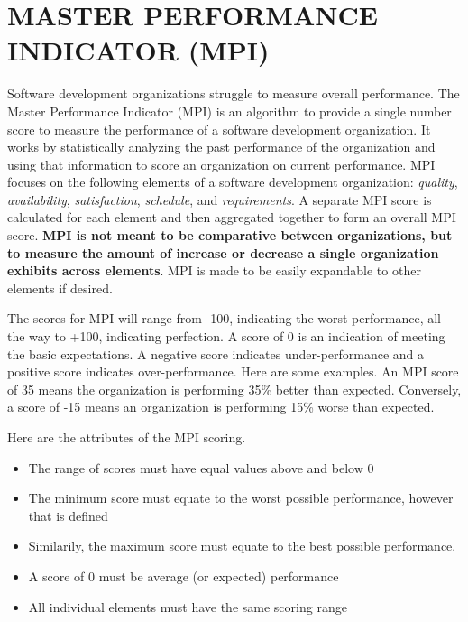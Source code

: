 \documentclass[SDSUThesis.tex]{subfiles}
\begin{document}
\section{MASTER PERFORMANCE INDICATOR (MPI)}

    Software development organizations struggle to measure overall performance.  
    The Master Performance Indicator (MPI) is an algorithm to provide a single 
    number score to measure the performance of a software development organization. 
    It works by statistically analyzing the past performance of the 
    organization and using that information to score an organization 
    on current performance.  MPI focuses on the following 
    elements of a software development organization: \textit{quality}, 
    \textit{availability}, \textit{satisfaction}, \textit{schedule},
    and \textit{requirements}. A separate MPI
    score is calculated for each element and 
    then aggregated together to form an overall 
    MPI score.   \textbf{MPI is not meant to be comparative between
    organizations, but to measure the amount of increase or decrease
    a single organization exhibits across elements}.  MPI is made to be easily 
    expandable to other elements if desired.
    
    The scores for MPI will range from -100, indicating the worst 
    performance, all the way to +100, indicating perfection.
    A score of 0 is an indication of meeting the basic expectations. 
    A negative score indicates under-performance and a 
    positive score indicates over-performance.   Here are some 
    examples. An MPI score of 35 means the organization is 
    performing 35\% better than expected.  Conversely, a score 
    of -15 means an organization is performing 15\% worse than expected.  

Here are the attributes of the MPI scoring.
    \begin{itemize}
        \item The range of scores must have equal values above and below 0
        \item The minimum score must equate to the worst possible 
            performance, however that is defined
        \item Similarily, the maximum score must equate to the best possible performance.  
        \item A score of 0 must be average (or expected) performance
        \item All individual elements must have the same scoring range
    \end{itemize}
            
\end{document}
